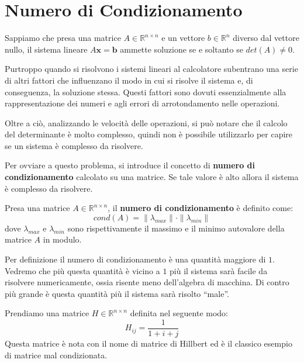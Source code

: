 \section{Numero di Condizionamento}
Sappiamo che presa una matrice $A \in \mathbb{R}^{n \times n}$ e un vettore $b
    \in \mathbb{R}^n$ diverso dal vettore nullo, il sistema lineare $A \textbf{x} =
    \textbf{b}$ ammette soluzione se e soltanto se $det(A) \neq 0$.

Purtroppo quando si risolvono i sistemi lineari al calcolatore subentrano una
serie di altri fattori che influenzano il modo in cui si risolve il sistema e,
di conseguenza, la soluzione stessa. Questi fattori sono dovuti essenzialmente
alla rappresentazione dei numeri e agli errori di arrotondamento nelle operazioni.

Oltre a ciò, analizzando le velocità delle operazioni, si può notare che il
calcolo del determinante è molto complesso, quindi non è possibile utilizzarlo
per capire se un sistema è complesso da risolvere.

Per ovviare a questo problema, si introduce il concetto di \textbf{numero di
    condizionamento} calcolato su una matrice. Se tale valore è alto allora il
sistema è complesso da risolvere.
\begin{definizione}
    Presa una matrice $A \in \mathbb{R}^{n \times n}$, il \textbf{numero di
        condizionamento} è definito come:
    \begin{equation}
        cond(A) = \|\lambda_{max}\| \cdot \|\lambda_{min}\|
    \end{equation}
    dove $\lambda_{max}$ e $\lambda_{min}$ sono rispettivamente il massimo e il
    minimo autovalore della matrice $A$ in modulo.
\end{definizione}
Per definizione il numero di condizionamento è una quantità maggiore di $1$.
Vedremo che più questa quantità è vicino a $1$ più il sistema sarà facile da
risolvere numericamente, ossia risente meno dell'algebra di macchina. Di contro
più grande è questa quantità più il sistema sarà risolto “male”.
\begin{esempio}
    Prendiamo una matrice $H \in \mathbb{R}^{n \times n}$ definita nel seguente modo:
    \begin{equation*}
        H_{ij}=\frac{1}{1+i+j}
    \end{equation*}
    Questa matrice è nota con il nome di matrice di Hillbert ed è il classico
    esempio di matrice mal condizionata.
\end{esempio}
